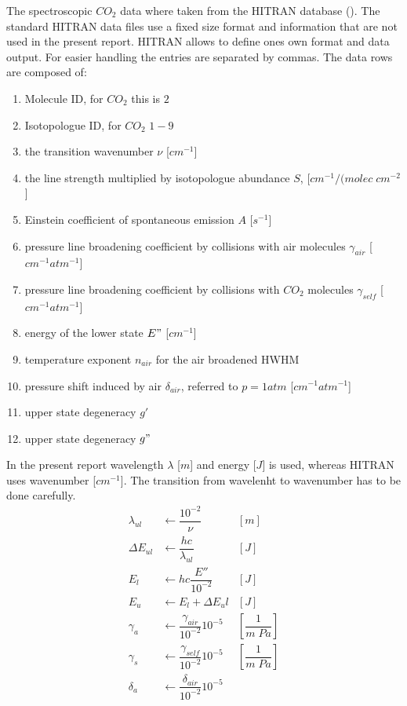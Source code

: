 The spectroscopic $CO_2$ data where taken from the HITRAN database (\cite{hitran1}). The standard HITRAN data files use a fixed size format and information that are not used in the present report. HITRAN allows to define ones own format and data output. For easier handling the entries are separated by commas. The data rows are composed of: 
\begin{enumerate}
	\item Molecule ID, for $CO_2$ this is $2$			
 	\item Isotopologue ID, for $CO_2$ $1-9$			
 	\item the transition wavenumber $\nu$	[$cm^{-1}$]		
    \item the line strength multiplied by isotopologue abundance $S$, [$cm^{-1}/(molec \;cm^{-2}$]		
 	\item Einstein coefficient of spontaneous emission $A$ [$s^{-1}$]		
 	\item pressure line broadening coefficient by collisions with air molecules $\gamma_{air}$ [$cm^{-1} atm^{-1}$]		
 	\item pressure line broadening coefficient by collisions with $CO_2$ molecules $\gamma_{self}$ [$cm^{-1} atm^{-1}$]		
	\item energy of the lower state $E"$ [$cm^{-1}$]		
	\item temperature exponent $n_{air}$ for the air broadened HWHM			
	\item pressure shift induced by air $\delta_{air}$, referred to $p = 1 atm$ [$cm^{-1} atm^{-1}$] 		
	\item upper state degeneracy $g'$			
	\item upper state degeneracy $g"$
\end{enumerate}
In the present report wavelength $\lambda$ [$m$] and energy [$J$] is used, whereas HITRAN uses wavenumber [$cm^{-1}$]. The transition from wavelenht to wavenumber has to be done carefully.  
\begin{align*}
	\lambda_{ul}     & \leftarrow \dfrac{10^{-2}}{\nu}               & [m]                   \\
	\Delta E_{ul}    & \leftarrow \dfrac{h  c}{\lambda_{ul}}         & [J]                   \\
 	E_l              & \leftarrow h  c  \dfrac{E''}{10^{-2}}         & [J]                   \\
	E_u              & \leftarrow E_l + \Delta E_ul                  & [J]                   \\
	\gamma_a         & \leftarrow \dfrac{\gamma_{air}}{10^{-2}}  10^{-5} & \left[\dfrac{1}{m \; Pa}\right] \\
	\gamma_s         & \leftarrow \dfrac{\gamma_{self}}{10^{-2}}  10^{-5} & \left[\dfrac{1}{m \; Pa}\right] \\
	\delta_a         & \leftarrow \dfrac{\delta_{air}}{10^{-2}}  10^{-5} &
\end{align*}


